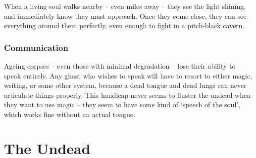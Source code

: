 \begin{multicols}{2}
When a living soul walks nearby -- even miles away -- they see the light shining, and immediately know they must approach.
Once they come close, they can see everything around them perfectly, even enough to fight in a pitch-black cavern.

\subsubsection{Communication}
\label{dead_communication}

Ageing corpses -- even those with minimal degradation -- lose their ability to speak entirely.
Any ghast who wishes to speak will have to resort to either magic, writing, or some other system, because a dead tongue and dead lungs can never articulate things properly.
This handicap never seems to fluster the undead when they want to use magic -- they seem to have some kind of `speech of the soul', which works fine without an actual tongue.

\end{multicols}

\section[The Undead]{The Undead \D}
\label{undead}

